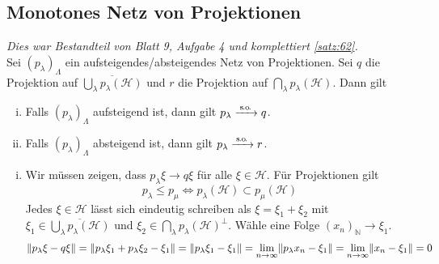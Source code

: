 \subsection{Monotones Netz von Projektionen} %
\label{sub:mon_proj}
\emph{Dies war Bestandteil von Blatt 9, Aufgabe 4 und komplettiert \autoref{satz:62}.} \smallskip \\
Sei $(p_\lambda)_\Lambda$ ein aufsteigendes/absteigendes Netz von Projektionen. 
Sei $q$ die Projektion auf $\overline{\bigcup_\lambda p_\lambda(\mathcal{H})}$ und $r$ die Projektion auf $\bigcap_\lambda p_\lambda(\mathcal{H})$. Dann gilt
\begin{enumerate}[(i),itemsep=0pt]
	\item Falls $(p_\lambda)_\Lambda$ aufsteigend ist, dann gilt $p_\lambda \grenzw{\so} q$.
	\item Falls $(p_\lambda)_\Lambda$ absteigend ist, dann gilt $p_\lambda \grenzw{\so} r$.
\end{enumerate}
\begin{beweis}
	\leavevmode
	\begin{enumerate}[(i)]
		\item Wir müssen zeigen, dass $p_\lambda \xi\to q \xi$ für alle $\xi \in \mathcal{H}$.
		Für Projektionen gilt
		\[
			p_\lambda \le p_\mu \iff p_\lambda(\mathcal{H}) \subset p_\mu(\mathcal{H})
		\]
		Jedes $\xi \in \mathcal{H}$ lässt sich eindeutig schreiben als $\xi=\xi_1 + \xi_2$ mit $\xi_1 \in \overline{\bigcup_\lambda p_\lambda(\mathcal{H})}$ und $\xi_2 \in \bigcap_\lambda p_\lambda(\mathcal{H})^\bot$.
		Wähle eine Folge $(x_n)_\mathbb{N} \to \xi_1$.
		\begin{align}
			\norm*{p_\lambda \xi -q \xi} = \norm*{p_\lambda \xi_1 + p_\lambda \xi_2 - \xi_1} = \norm*{p_\lambda \xi_1 - \xi_1} = \lim_{n\to \infty} \norm*{p_\lambda x_n - \xi_1}
			= \lim_{n \to \infty} \norm*{x_n - \xi_1} =0
		\end{align}
	\end{enumerate}
\end{beweis}


\printindex
\listoffigures
\todototoc
{}
